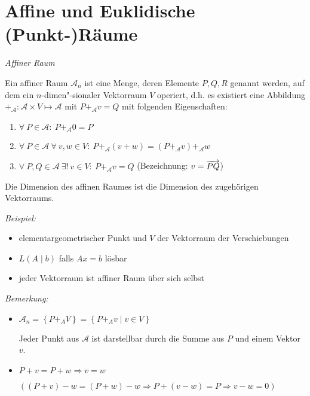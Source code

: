 \section{Affine und Euklidische (Punkt-)Räume} %
\label{sec:Affine und Euklidische (Punkt-)Räume}

\begin{mydef} \textit{Affiner Raum}

    Ein affiner Raum $\mathcal{A}_n$ ist eine Menge, deren Elemente $P,Q,R$ genannt werden, auf dem ein $n$-dimen"-sionaler Vektorraum $V$ operiert,
    d.h. es existiert eine Abbildung $+_{\mathcal{A}}: \mathcal{A} \times V \mapsto \mathcal{A}$ mit $P +_{\mathcal{A}} v = Q$ mit folgenden Eigenschaften:
    \begin{enumerate}[label=(\roman*)]
        \item \label{EigaffRaum1} $\forall\ P \in \mathcal{A}:\ P +_{\mathcal{A}} 0 = P$
        \item \label{EigaffRaum2} $\forall\ P \in \mathcal{A}\ \forall \ v,w \in V:\ P +_{\mathcal{A}} (v + w) = (P +_{\mathcal{A}} v) +_{\mathcal{A}} w$
        \item \label{EigaffRaum3} $\forall\ P,Q \in \mathcal{A}\ \exists! \ v \in V:\ P +_{\mathcal{A}} v  = Q$ \hfill (Bezeichnung: $v = \overrightarrow{PQ}$)
    \end{enumerate}
    Die Dimension des affinen Raumes ist die Dimension des zugehörigen Vektorraums.
\end{mydef}

\textit{Beispiel:}
\begin{itemize}
    \item elementargeometrischer Punkt und $V$ der Vektorraum der Verschiebungen
    \item $L(A \mid b)$ falls $Ax = b$ lösbar
    \item jeder Vektorraum ist affiner Raum über sich selbst
\end{itemize}

\textit{Bemerkung:}
\begin{itemize}
    \item $\mathcal{A}_n = \left\{ P +_A V \right\} = \left\{ P +_A v \mid v \in V \right\}$

        Jeder Punkt aus $\mathcal{A}$ ist darstellbar durch die Summe aus $P$ und einem Vektor $v$.
    \item $P + v = P + w \Rightarrow v = w$

        $\left( (P+v)-w = (P+w)-w \Rightarrow P + (v-w) = P \Rightarrow v-w = 0 \right)$
\end{itemize}

